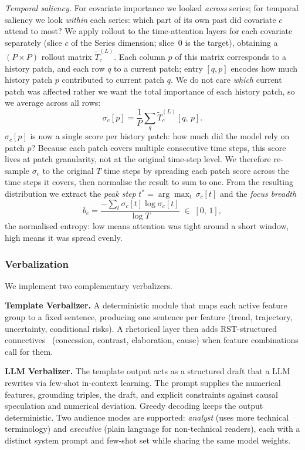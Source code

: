 \documentclass[conference]{IEEEtran}
\begin{document}
\emph{Temporal saliency.}
For covariate importance we looked \emph{across} series; for temporal saliency we look \emph{within} each series: which part of its own past did covariate $c$ attend to most? We apply rollout to the time-attention layers for each covariate separately (slice $c$ of the Series dimension; slice~0 is the target), obtaining a $(P \times P)$ rollout matrix $\tilde{T}^{(L)}_c$.
Each column $p$ of this matrix corresponds to a history patch, and each row $q$ to a current patch; entry $[q,p]$ encodes how much history patch $p$ contributed to current patch $q$.
We do not care \emph{which} current patch was affected rather we want the total importance of each history patch, so we average across all rows:
%
\begin{equation}
  \sigma_c[p] = \frac{1}{P}\sum_{q}\tilde{T}^{(L)}_c[q,\,p].
\end{equation}
%
$\sigma_c[p]$ is now a single score per history patch: how much did the model rely on patch $p$?
Because each patch covers multiple consecutive time steps, this score lives at patch granularity, not at the original time-step level.
We therefore re-sample $\sigma_c$ to the original $T$ time steps by spreading each patch score across the time steps it covers, then normalise the result to sum to one.
From the resulting distribution we extract the \emph{peak step} $t^{*} = \arg\max_t\,\sigma_c[t]$ and the \emph{focus breadth}
%
\begin{equation}
  b_c = \frac{-\sum_{t}\sigma_c[t]\log\sigma_c[t]}{\log T} \;\in\; [0,\,1],
\end{equation}
%
the normalised entropy: low means attention was tight around a short window, high means it was spread evenly.

\subsubsection{Verbalization}

We implement two complementary verbalizers.

\textbf{Template Verbalizer.}
A deterministic module that maps each active feature group to a fixed sentence, producing one sentence per feature (trend, trajectory, uncertainty, conditional risks). A rhetorical layer then adds RST-structured connectives~\cite{mann1988rst} (concession, contrast, elaboration, cause) when feature combinations call for them.

\textbf{LLM Verbalizer.}
The template output acts as a structured draft that a LLM rewrites via few-shot in-context learning. The prompt supplies the numerical features, grounding triples, the draft, and explicit constraints against causal speculation and numerical deviation. Greedy decoding keeps the output deterministic. Two audience modes are supported: \emph{analyst} (uses more technical terminology) and \emph{executive} (plain language for non-technical readers), each with a distinct system prompt and few-shot set while sharing the same model weights.
\end{document}
